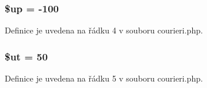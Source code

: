 \hypertarget{courieri_8php_a6b5ad2ac55f9df46e8f34e78fbd6f176}{
\subsubsection[{\$up}]{\setlength{\rightskip}{0pt plus 5cm}\$up = -\/100}}\label{courieri_8php_a6b5ad2ac55f9df46e8f34e78fbd6f176}


Definice je uvedena na řádku 4 v souboru courieri.\-php.

\hypertarget{courieri_8php_aadd3f841051043ee58e587e840e8dd0b}{
\subsubsection[{\$ut}]{\setlength{\rightskip}{0pt plus 5cm}\$ut = 50}}\label{courieri_8php_aadd3f841051043ee58e587e840e8dd0b}


Definice je uvedena na řádku 5 v souboru courieri.\-php.

